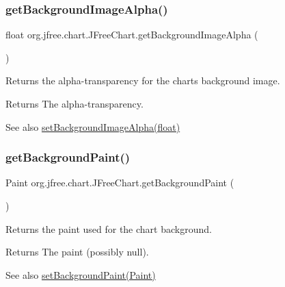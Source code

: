 \subsubsection{\texorpdfstring{get\+Background\+Image\+Alpha()}{getBackgroundImageAlpha()}}
{\footnotesize\ttfamily float org.\+jfree.\+chart.\+J\+Free\+Chart.\+get\+Background\+Image\+Alpha (\begin{DoxyParamCaption}{ }\end{DoxyParamCaption})}

Returns the alpha-\/transparency for the chart\textquotesingle{}s background image.

\begin{DoxyReturn}{Returns}
The alpha-\/transparency.
\end{DoxyReturn}
\begin{DoxySeeAlso}{See also}
\mbox{\hyperlink{classorg_1_1jfree_1_1chart_1_1_j_free_chart_afe8e3a04968eed8d032c08b259aa7f46}{set\+Background\+Image\+Alpha(float)}} 
\end{DoxySeeAlso}
\mbox{\label{classorg_1_1jfree_1_1chart_1_1_j_free_chart_af0544f25aaf27bda9f06147c249156f3}} 
\subsubsection{\texorpdfstring{get\+Background\+Paint()}{getBackgroundPaint()}}
{\footnotesize\ttfamily Paint org.\+jfree.\+chart.\+J\+Free\+Chart.\+get\+Background\+Paint (\begin{DoxyParamCaption}{ }\end{DoxyParamCaption})}

Returns the paint used for the chart background.

\begin{DoxyReturn}{Returns}
The paint (possibly {\ttfamily null}).
\end{DoxyReturn}
\begin{DoxySeeAlso}{See also}
\mbox{\hyperlink{classorg_1_1jfree_1_1chart_1_1_j_free_chart_a425911935a24fdd3fde08dca49512c2a}{set\+Background\+Paint(\+Paint)}} 
\end{DoxySeeAlso}
\mbox{\label{classorg_1_1jfree_1_1chart_1_1_j_free_chart_ad054ae2945e4634fd962c9bf2029c15f}} 

